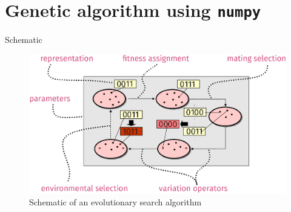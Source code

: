 \documentclass[presentation]{beamer}
\begin{document}
\section{Genetic algorithm using \texttt{numpy}}
\label{sec:orgf2bee9b}
\begin{frame}[label={sec:org2aec3b2}]{Schematic}
\footnotesize
\begin{figure}[htbp]
\centering
\includegraphics[width=1.0\textwidth]{images/ga_schematic.png}
\caption{Schematic of an evolutionary search algorithm}
\end{figure}
\end{frame}
\end{document}
